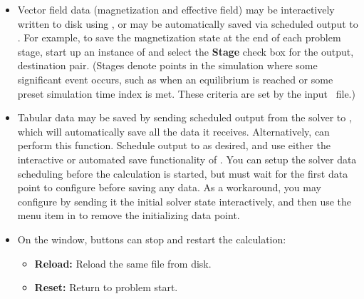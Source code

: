\begin{list}{}{\setlength{\labelwidth}{0pt}
               \setlength{\leftmargin}{0pt}
               \setlength{\rightmargin}{\leftmargin}
               \setlength{\itemsep}{0pt}}
\begin{description}
    \begin{itemize}
      \item Vector field data (magnetization and effective field) may be
        interactively written to disk using
        , or may be
        automatically saved via scheduled output to
        .  For example, to
        save the magnetization state at the end of each problem
        stage, start up an instance of  and select
        the {\bf Stage} check box for
        the  output,  destination pair.
        (Stages denote points in the simulation where some
         significant event occurs, such as when an equilibrium is
         reached or some preset simulation time index is met.
         These criteria are set by the input \MIF\ file.)
      \item Tabular data may be saved by
        sending scheduled output from the
        solver to ,
        which will automatically save all the data it receives.
        Alternatively, 
        can perform this function.  Schedule output to
         as desired, and use either the
        interactive or automated save functionality of
        .  You can setup the solver data
        scheduling before the calculation is started, but must wait
        for the first data point to configure  before
        saving any data.  As a workaround, you may configure
         by sending it the initial solver state
        interactively, and then use the {} menu item in  to remove the
        initializing data point.
      \end{itemize}
    \item[Midcourse control:]\blankspace
    \begin{itemize}
       \item On the  window, buttons can stop and restart the
             calculation:
       \begin{itemize}
         \item {\bf Reload:} Reload the same file from disk.
         \item {\bf Reset:}  Return to problem start.

\end{itemize}
\end{itemize}
\end{description}
\end{list}
